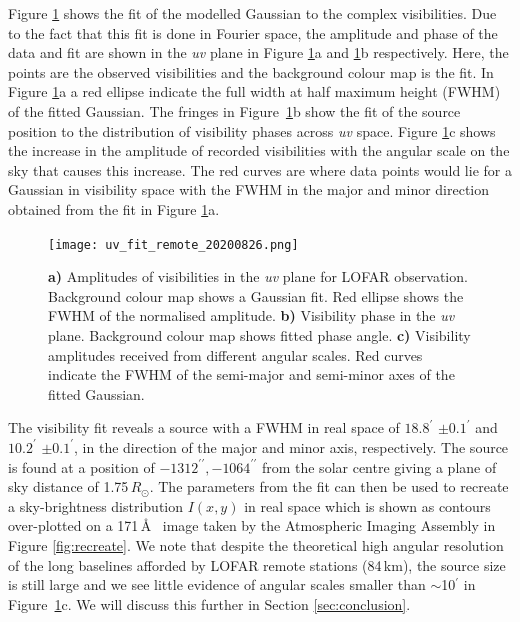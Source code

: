 Figure \ref{fig:uv_fit} shows the fit of the modelled Gaussian to the complex visibilities. Due to the fact that this fit is done in Fourier space, the amplitude and phase of the data and fit are shown in the \textit{uv} plane in Figure \ref{fig:uv_fit}a and \ref{fig:uv_fit}b respectively. Here, the points are the observed visibilities and the background colour map is the fit. In Figure \ref{fig:uv_fit}a a red ellipse indicate the full width at half maximum height (FWHM) of the fitted Gaussian. The fringes in Figure~\ref{fig:uv_fit}b show the fit of the source position to the distribution of visibility phases across \textit{uv} space.
Figure \ref{fig:uv_fit}c shows the increase in the amplitude of recorded visibilities with the angular scale on the sky that causes this increase. The red curves are where data points would lie for a Gaussian in visibility space with the FWHM in the major and minor direction obtained from the fit in Figure \ref{fig:uv_fit}a.

\begin{figure}
    \centering
    \texttt{[image: uv\_fit\_remote\_20200826.png]}
    \caption[Results of directly fitting LOFAR visibilities.]{\textbf{a)} Amplitudes of visibilities in the \textit{uv} plane for LOFAR observation. Background colour map shows a Gaussian fit. Red ellipse shows the FWHM of the normalised amplitude. \textbf{b)} Visibility phase in the \textit{uv} plane. Background colour map shows fitted phase angle. \textbf{c)} Visibility amplitudes received from different angular scales. Red curves indicate the FWHM of the semi-major and semi-minor axes of the fitted Gaussian.}
    \label{fig:uv_fit}
\end{figure}

The visibility fit reveals a source with a FWHM in real space of $18.8^\prime$ $\pm 0.1^\prime$ and $10.2^\prime$ $\pm 0.1^\prime$, in the direction of the major and minor axis, respectively. The source is found at a position of $-1312^{\prime\prime}, -1064^{\prime\prime}$ from the solar centre giving a plane of sky distance of 1.75$\, R_\odot$. The parameters from the fit can then be used to recreate a sky-brightness distribution $I(x,y)$ in real space which is shown as contours over-plotted on a 171\,\AA~ image taken by the Atmospheric Imaging Assembly \citep[AIA;][]{Lemen2012} in Figure \ref{fig:recreate}. We note that despite the theoretical high angular resolution of the long baselines afforded by LOFAR remote stations (84\,km), the source size is still large and we see little evidence of angular scales smaller than $\sim$10$^\prime$ in Figure~\ref{fig:uv_fit}c. We will discuss this further in Section \ref{sec:conclusion}.


